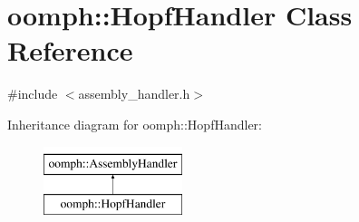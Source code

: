 \hypertarget{classoomph_1_1HopfHandler}{}\section{oomph\+:\+:Hopf\+Handler Class Reference}
\label{classoomph_1_1HopfHandler}


{\ttfamily \#include $<$assembly\+\_\+handler.\+h$>$}

Inheritance diagram for oomph\+:\+:Hopf\+Handler\+:\begin{figure}[H]
\begin{center}
\leavevmode
\includegraphics[height=2.000000cm]{classoomph_1_1HopfHandler}
\end{center}
\end{figure}
